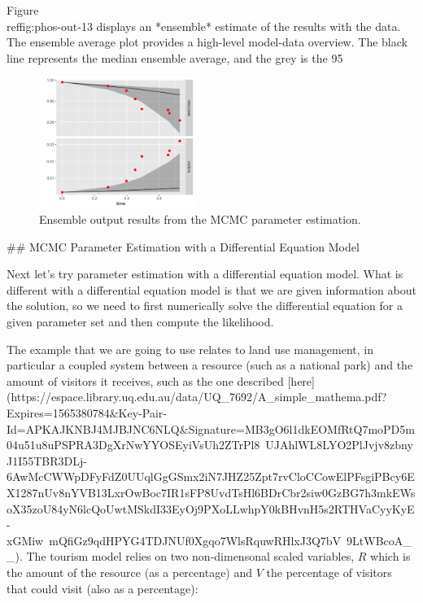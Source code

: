 \documentclass[
]{book}
\theoremstyle{definition}
\theoremstyle{definition}
\theoremstyle{definition}
\theoremstyle{remark}
\begin{document}
Figure \\ref{fig:phos-out-13} displays an *ensemble* estimate of the results with the data. The ensemble average plot provides a high-level model-data overview.  The black line represents the median ensemble average, and the grey is the 95%


\begin{figure}
\includegraphics[width=2in]{figures/13-mcmc/output-plot} \caption{Ensemble output results from the MCMC parameter estimation.}\label{fig:phos-out-13}
\end{figure}

## MCMC Parameter Estimation with a Differential Equation Model

Next let's try parameter estimation with a differential equation model. What is different with a differential equation model is that we are given information about the solution, so we need to first numerically solve the differential equation for a given parameter set and then compute the likelihood.

The example that we are going to use relates to land use management, in particular a coupled system between a resource (such as a national park) and the amount of visitors it receives, such as the one described [here](https://espace.library.uq.edu.au/data/UQ_7692/A_simple_mathema.pdf?Expires=1565380784&Key-Pair-Id=APKAJKNBJ4MJBJNC6NLQ&Signature=MB3gO6l1dkEOMfRtQ7moPD5m04u51u8uPSPRA3DgXrNwYYOSEyiVsUh2ZTrPl8~UJAhlWL8LYO2PlJvjv8zbnyJ1I55TBR3DLj-6AwMcCWWpDFyFdZ0UUqlGgGSmx2iN7JHZ25Zpt7rvCloCCowElPFsgiPBcy6EX1287nUv8nYVB13LxrOwBoc7IR1sFP8UvdTsHl6BDrCbr2siw0GzBG7h3mkEWsoX35zoU84yN6lcQoUwtMSkdI33EyOj9PXoLLwhpY0kBHvnH5s2RTHVaCyyKyE-xGMiw~mQfiGz9qdHPYG4TDJNUf0Xgqo7WlsRquwRHlxJ3Q7bV~9LtWBcoA__). The tourism model relies on two non-dimensonal scaled variables, $R$ which is the amount of the resource (as a percentage) and $V$ the percentage of visitors that could visit (also as a percentage):
\end{document}
